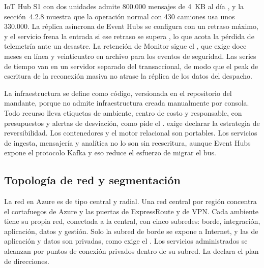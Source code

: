 IoT Hub S1 con dos unidades admite 800.000 mensajes de 4~KB al día \parencite{ms_iothub_cuotas}, y la
sección~4.2.8 muestra que la operación normal con 430 camiones usa unos 330.000. La réplica asíncrona de
Event Hubs se configura con un retraso máximo, y el servicio frena la entrada si ese retraso se supera
\parencite{ms_eh_georep}, lo que acota la pérdida de telemetría ante un desastre. La retención de
Monitor sigue el , que exige doce meses en línea y veinticuatro en archivo para los
eventos de seguridad. Las series de tiempo van en un servidor separado del transaccional, de modo que
el peak de escritura de la reconexión masiva no atrase la réplica de los datos del despacho.


La infraestructura se define como código, versionada en el repositorio del mandante, porque
 no admite infraestructura creada manualmente por consola. Todo recurso lleva
etiquetas de ambiente, centro de costo y responsable, con presupuestos y alertas de desviación, como
pide el .  exige declarar la estrategia de reversibilidad. Los
contenedores y el motor relacional son portables. Los servicios de ingesta, mensajería y analítica no lo
son sin reescritura, aunque Event Hubs expone el protocolo Kafka y eso reduce el esfuerzo de migrar el
bus.

\subsection{Topología de red y segmentación}\label{sec:4-red}

La red en Azure es de tipo central y radial. Una red central por región concentra el cortafuegos de
Azure y las puertas de ExpressRoute y de VPN. Cada ambiente tiene su propia red, conectada a la
central, con cinco subredes: borde, integración, aplicación, datos y gestión. Solo la subred de borde se
expone a Internet, y las de aplicación y datos son privadas, como exige el . Los servicios
administrados se alcanzan por puntos de conexión privados dentro de su subred. La 
declara el plan de direcciones.

